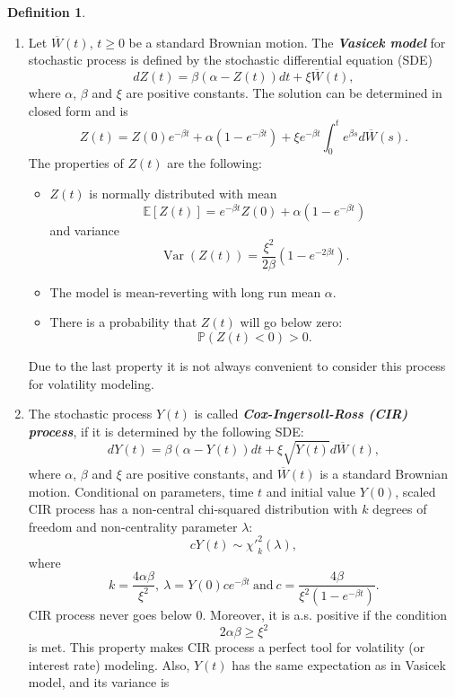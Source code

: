 \documentclass[a4paper,11pt]{article}
\theoremstyle{plain}
\theoremstyle{definition}
\newtheorem{defn}[thm]{Definition}
\newcommand{\ME}{\mathbb{E}}
\newcommand{\MP}{\mathbb{P}}
\newcommand{\Var}{\operatorname{Var}}
\newcommand{\define}[1]{\textit{\textbf{#1}}}
\begin{document}
    \begin{defn} \
    	\begin{enumerate}
    		\item 
    		Let $\overline{W}(t)$, $t \geq 0$ be a standard Brownian motion. The \define{Vasicek model} for stochastic process is defined by the stochastic differential equation (SDE)
    		\begin{equation} \label{Vasicek}
    		dZ(t) = \beta(\alpha - Z(t))dt + \xi \overline{W}(t),
    		\end{equation}
    		where $\alpha$, $\beta$ and $\xi$ are positive constants. The solution can be determined in closed form and is
    		\[ Z(t) = Z(0) e^{-\beta t} + \alpha (1 - e^{-\beta t}) + \xi e^{-\beta t} \int_{0}^{t} e^{\beta s}d\overline{W}(s).\]
    		The properties of $Z(t)$ are the following:
    		\begin{itemize}
    			\item $Z(t)$ is normally distributed with mean
    			\[ \ME[Z(t)] = e^{-\beta t} Z(0) + \alpha(1-e^{-\beta t}) \]
    			and variance
    			\[ \Var(Z(t)) = \frac{\xi^2}{2\beta} (1-e^{-2\beta t}). \]
    			\item The model is mean-reverting with long run mean $\alpha$.
    			\item There is a probability that $Z(t)$ will go below zero:
    			\[ \MP(Z(t) < 0) > 0. \]
    		\end{itemize}
    		Due to the last property it is not always convenient to consider this process for volatility modeling.
    		\item
    		The stochastic process $Y(t)$ is called \define{Cox-Ingersoll-Ross (CIR) process}, if it is determined by the following SDE:
    		\begin{equation} \label{CIR}
    		dY(t) = \beta(\alpha - Y(t))dt + \xi\sqrt{Y(t)}d \overline{W}(t),
    		\end{equation}
    		where $\alpha$, $\beta$ and $\xi$ are positive constants, and $\overline{W}(t)$ is a standard Brownian motion. Conditional on parameters, time $t$ and initial value $Y(0)$, scaled CIR process has a non-central chi-squared distribution with $k$ degrees of freedom and non-centrality parameter $\lambda$:
    		\[ c Y(t) \sim {\chi'}_k^2(\lambda),  \]
    		where
    		\[k = \frac{4\alpha \beta}{\xi^2},\ \lambda = Y(0) c e^{-\beta t} \ \text{and} \ c = \frac{4 \beta}{\xi^2 (1-e^{-\beta t})}.\]
    		CIR process never goes below $0$. Moreover, it is a.s. positive if the condition
    		\[ 2\alpha \beta \geq \xi^2  \]
    		is met. This property makes CIR process a perfect tool for volatility (or interest rate) modeling. Also, $Y(t)$ has the same expectation as in Vasicek model, and its variance is

\end{enumerate}
\end{defn}
\end{document}
